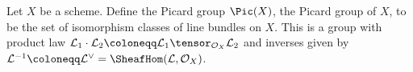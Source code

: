 Let $X$ be a scheme. Define the Picard group $\Pic(X)$, the Picard group of $X$,
to be the set of isomorphism classes of line bundles on $X$. This is a group with
product law $\mathcal{L}_1\cdot \mathcal{L}_2\coloneqq \mathcal{L}_1\tensor_{\mathcal{O}_X} \mathcal{L}_2$ and
inverses given by $\mathcal{L}^{-1}\coloneqq \mathcal{L}^\vee = \SheafHom(\mathcal{L}, \mathcal{O}_X)$.
